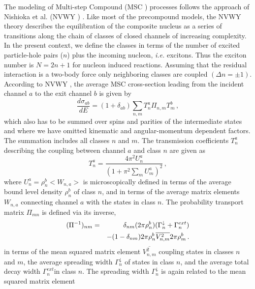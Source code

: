 The modeling of Multi-step Compound%
 (MSC%
) processes follows the approach of Nishioka et al. (NVWY%
) \cite{NVWY}. Like most of the precompound models, the NVWY
theory describes the equilibration of the composite nucleus as a series of
transitions along the chain of classes of closed channels of increasing
complexity. In the present context, we define the classes in terms of the
number of excited particle-hole pairs ($n$) plus the incoming nucleon,
\textit{i.e.} excitons. Thus the exciton number is $N=2n+1$ for nucleon
induced reactions. Assuming that the residual interaction is a two-body
force only neighboring classes are coupled $(\Delta n=\pm1)$. According to
NVWY%
, the average MSC%
 cross-section leading from the incident channel $a$ to the exit
channel $b$ is given by
\begin{equation}
\frac{d\sigma_{ab}}{dE}=(1+\delta_{ab})\sum_{n,m}T_{n}^{a}\Pi_{n,m}T_{m}^{b}%
\,,  \label{msccs}
\end{equation}
which also has to be summed over spins and parities of the intermediate
states and where we have omitted kinematic and angular-momentum dependent
factors. The summation includes all classes $n$ and $m$. The transmission
coefficients $T_{n}^{a}$ describing the coupling between channel $a$ and
class $n$ are given as
\begin{equation}
T_{n}^{a}=\frac{4\pi^{2}U_{n}^{a}}{\left(1+\pi^{2}\sum_{m}U_{m}^{a}%
\right)^{2}}\,,  \label{TlMSC}
\end{equation}
\noindent where $U_{n}^{a}=\rho_{n}^{b}<W_{n,a}>$ is microscopically defined
in terms of the average bound level density%
 $\rho_{n}^{b}$ of class $n$, and in terms of the
average matrix elements $W_{n,a}$ connecting channel $a$ with the states in
class $n$. The probability transport matrix $\Pi_{mn}$ is defined via its
inverse,
\begin{eqnarray}
(\Pi^{-1})_{nm}&=&\delta_{nm}(2\pi\rho_{n}^{b})(\Gamma_{n}^{\downarrow}+%
\Gamma_{n}^{ext})  \notag \\
&&-(1-\delta_{nm})2\pi\rho_{n}^{b}%
\overline{V_{n,m}^{2}}2\pi\rho_{m}^{b}\,.  \label{Pi}
\end{eqnarray}
in terms of the mean squared matrix element $\overline{V_{n,m}^{2}}$
coupling states in classes $n$ and $m$, the average spreading width $%
\Gamma_{n}^{\downarrow}$ of states in class $n$, and the average total decay
width $\Gamma_{n}^{ext}$in class $n$. The spreading width $%
\Gamma_{n}^{\downarrow}$ is again related to the mean squared matrix element
